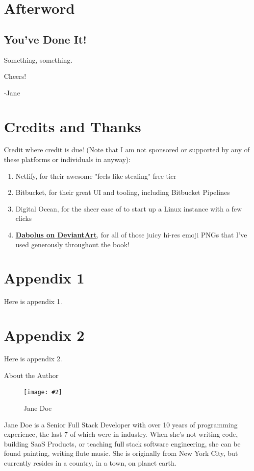 \documentclass[a4paper,headinclude=on,footinclude=on,12pt,oneside]{scrbook}
\newcommand{\link}[2]{\textbf{\textcolor{monokaiPink}{\href{#2}{#1}}}}
\newcommand{\standardfigure}[3]{\begin{figure}[H]\begin{center}\texttt{[image: \#2]}\caption{#3}\label{fig:#2}\end{center}\end{figure}}
\begin{document}
\chapter*{Afterword}

\section*{You've Done It!}

Something, something.

Cheers! \beers

-Jane

\chapter*{Credits and Thanks}

Credit where credit is due! (Note that I am not sponsored or supported by any of these platforms or individuals in anyway):

\begin{enumerate}
\item Netlify, for their awesome "feels like stealing" free tier
\item Bitbucket, for their great UI and tooling, including Bitbucket Pipelines
\item Digital Ocean, for the sheer ease of to start up a Linux instance with a few clicks
\item \link{Dabolus on DeviantArt}{https://www.deviantart.com/dabolus}, for all of those juicy hi-res emoji PNGs that I've used generously throughout the book!
\end{enumerate}

\begin{appendices}

\chapter{Appendix 1}

Here is appendix 1.

\chapter{Appendix 2}

Here is appendix 2.

\end{appendices}

\printindex
{}


About the Author

\standardfigure{\textwidth/2}{about/author}{Jane Doe}

Jane Doe is a Senior Full Stack Developer with over 10 years of programming experience, the last 7 of which were in industry. When she's not writing code, building SaaS Products, or teaching full stack software engineering, she can be found painting, writing flute music. She is originally from New York City, but currently resides in a country, in a town, on planet earth.
\end{document}
